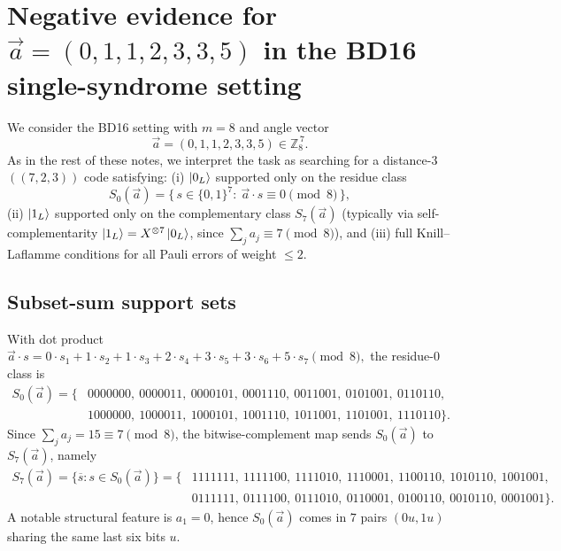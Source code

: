 \documentclass[11pt]{article}
\begin{document}
\section{Negative evidence for \texorpdfstring{$\vec a=(0,1,1,2,3,3,5)$}{a=(0,1,1,2,3,3,5)} in the BD16 single-syndrome setting}

We consider the BD16 setting with \(m=8\) and angle vector
\[
\vec a=(0,1,1,2,3,3,5)\in\mathbb{Z}_8^{\,7}.
\]
As in the rest of these notes, we interpret the task as searching for a distance-\(3\) \(((7,2,3))\) code satisfying:
(i) \(\ket{0_L}\) supported only on the residue class
\[
S_0(\vec a)=\{\,s\in\{0,1\}^7:\ \vec a\cdot s \equiv 0 \pmod 8\,\},
\]
(ii) \(\ket{1_L}\) supported only on the complementary class \(S_7(\vec a)\) (typically via self-complementarity
\(\ket{1_L}=X^{\otimes 7}\ket{0_L}\), since \(\sum_j a_j\equiv 7\pmod 8\)), and
(iii) full Knill--Laflamme conditions for all Pauli errors of weight \(\le 2\).

\subsection{Subset-sum support sets}
With dot product
\(
\vec a\cdot s = 0\cdot s_1 + 1\cdot s_2 + 1\cdot s_3 + 2\cdot s_4 + 3\cdot s_5 + 3\cdot s_6 + 5\cdot s_7
\pmod 8,
\)
the residue-\(0\) class is
\[
\begin{aligned}
S_0(\vec a)=\{&
0000000,\ 0000011,\ 0000101,\ 0001110,\ 0011001,\ 0101001,\ 0110110,\\
&1000000,\ 1000011,\ 1000101,\ 1001110,\ 1011001,\ 1101001,\ 1110110
\}.
\end{aligned}
\]
Since \(\sum_j a_j=15\equiv 7\pmod 8\), the bitwise-complement map sends \(S_0(\vec a)\) to \(S_7(\vec a)\), namely
\[
\begin{aligned}
S_7(\vec a)=\{\overline{s}:s\in S_0(\vec a)\}=\{&
1111111,\ 1111100,\ 1111010,\ 1110001,\ 1100110,\ 1010110,\ 1001001,\\
&0111111,\ 0111100,\ 0111010,\ 0110001,\ 0100110,\ 0010110,\ 0001001
\}.
\end{aligned}
\]
A notable structural feature is \(a_1=0\), hence \(S_0(\vec a)\) comes in \(7\) pairs \((0u,1u)\) sharing the same last
six bits \(u\).
\end{document}
